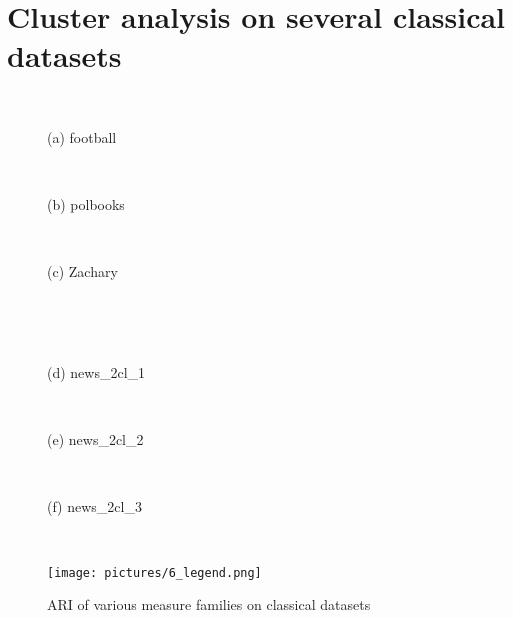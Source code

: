 \documentclass{article}
\begin{document}
\section{Cluster analysis on several classical datasets}
\begin{figure}[H]
	\begin{minipage}{.32\textwidth}
		\\\centerline{(a) football}
	\end{minipage}
	\begin{minipage}{.32\textwidth}
		\\\centerline{(b) polbooks}
	\end{minipage}
	\begin{minipage}{.32\textwidth}
		\\\centerline{(c) Zachary}
	\end{minipage}
    \\[10pt]
	\begin{minipage}{.32\textwidth}
		\\\centerline{(d) news\_2cl\_1}
	\end{minipage}
	\begin{minipage}{.32\textwidth}
		\\\centerline{(e) news\_2cl\_2}
	\end{minipage}
	\begin{minipage}{.32\textwidth}
		\\\centerline{(f) news\_2cl\_3}
	\end{minipage}
	\\[10pt]
    \begin{minipage}{\textwidth}
        \hfill\texttt{[image: pictures/6\_legend.png]}\hfill
	\end{minipage}
  \caption{\label{f_datasets}ARI of various measure families on classical datasets}
\end{figure}
\end{document}
